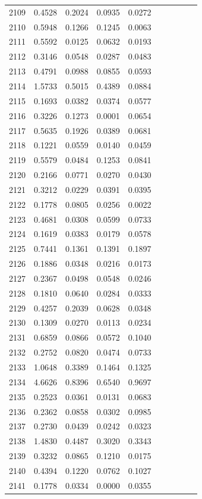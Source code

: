 \begin{table}
\begin{tabular}{cccccccccc}
2109& 0.4528& 0.2024& 0.0935& 0.0272\\ 
2110& 0.5948& 0.1266& 0.1245& 0.0063\\ 
2111& 0.5592& 0.0125& 0.0632& 0.0193\\ 
2112& 0.3146& 0.0548& 0.0287& 0.0483\\ 
2113& 0.4791& 0.0988& 0.0855& 0.0593\\ 
2114& 1.5733& 0.5015& 0.4389& 0.0884\\ 
2115& 0.1693& 0.0382& 0.0374& 0.0577\\ 
2116& 0.3226& 0.1273& 0.0001& 0.0654\\ 
2117& 0.5635& 0.1926& 0.0389& 0.0681\\ 
2118& 0.1221& 0.0559& 0.0140& 0.0459\\ 
2119& 0.5579& 0.0484& 0.1253& 0.0841\\ 
2120& 0.2166& 0.0771& 0.0270& 0.0430\\ 
2121& 0.3212& 0.0229& 0.0391& 0.0395\\ 
2122& 0.1778& 0.0805& 0.0256& 0.0022\\ 
2123& 0.4681& 0.0308& 0.0599& 0.0733\\ 
2124& 0.1619& 0.0383& 0.0179& 0.0578\\ 
2125& 0.7441& 0.1361& 0.1391& 0.1897\\ 
2126& 0.1886& 0.0348& 0.0216& 0.0173\\ 
2127& 0.2367& 0.0498& 0.0548& 0.0246\\ 
2128& 0.1810& 0.0640& 0.0284& 0.0333\\ 
2129& 0.4257& 0.2039& 0.0628& 0.0348\\ 
2130& 0.1309& 0.0270& 0.0113& 0.0234\\ 
2131& 0.6859& 0.0866& 0.0572& 0.1040\\ 
2132& 0.2752& 0.0820& 0.0474& 0.0733\\ 
2133& 1.0648& 0.3389& 0.1464& 0.1325\\ 
2134& 4.6626& 0.8396& 0.6540& 0.9697\\ 
2135& 0.2523& 0.0361& 0.0131& 0.0683\\ 
2136& 0.2362& 0.0858& 0.0302& 0.0985\\ 
2137& 0.2730& 0.0439& 0.0242& 0.0323\\ 
2138& 1.4830& 0.4487& 0.3020& 0.3343\\ 
2139& 0.3232& 0.0865& 0.1210& 0.0175\\ 
2140& 0.4394& 0.1220& 0.0762& 0.1027\\ 
2141& 0.1778& 0.0334& 0.0000& 0.0355\\ 

\end{tabular}
\end{table}
